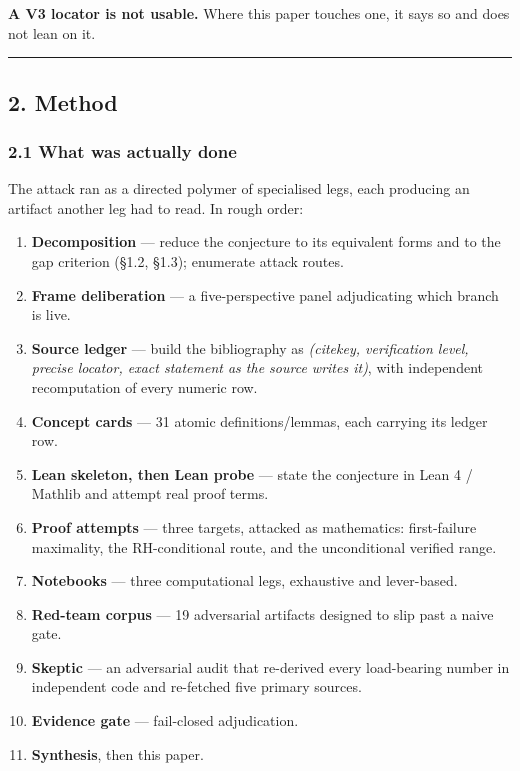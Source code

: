 \documentclass[
  a4paper,
  11pt]{article}
\providecommand{\tightlist}{%
  \setlength{\itemsep}{0pt}\setlength{\parskip}{0pt}}
\begin{document}
\textbf{A V3 locator is not usable.} Where this paper touches one, it
says so and does not lean on it.

\begin{center}\rule{0.5\linewidth}{0.5pt}\end{center}

\subsection{2. Method}\label{2-method}

\subsubsection{2.1 What was actually
done}\label{21-what-was-actually-done}

The attack ran as a directed polymer of specialised legs, each producing
an artifact another leg had to read. In rough order:

\begin{enumerate}
\def\labelenumi{\arabic{enumi}.}
\tightlist
\item
  \textbf{Decomposition} --- reduce the conjecture to its equivalent
  forms and to the gap criterion (§1.2, §1.3); enumerate attack routes.
\item
  \textbf{Frame deliberation} --- a five-perspective panel adjudicating
  which branch is live.
\item
  \textbf{Source ledger} --- build the bibliography as \emph{(citekey,
  verification level, precise locator, exact statement as the source
  writes it)}, with independent recomputation of every numeric row.
\item
  \textbf{Concept cards} --- 31 atomic definitions/lemmas, each carrying
  its ledger row.
\item
  \textbf{Lean skeleton, then Lean probe} --- state the conjecture in
  Lean 4 / Mathlib and attempt real proof terms.
\item
  \textbf{Proof attempts} --- three targets, attacked as mathematics:
  first-failure maximality, the RH-conditional route, and the
  unconditional verified range.
\item
  \textbf{Notebooks} --- three computational legs, exhaustive and
  lever-based.
\item
  \textbf{Red-team corpus} --- 19 adversarial artifacts designed to slip
  past a naive gate.
\item
  \textbf{Skeptic} --- an adversarial audit that re-derived every
  load-bearing number in independent code and re-fetched five primary
  sources.
\item
  \textbf{Evidence gate} --- fail-closed adjudication.
\item
  \textbf{Synthesis}, then this paper.
\end{enumerate}
\end{document}
